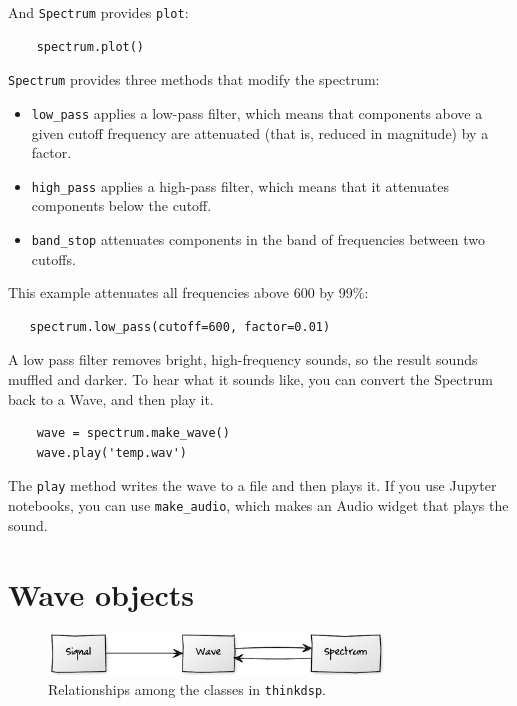 \documentclass[12pt]{book}
\begin{document}
And {\tt Spectrum} provides {\tt plot}:

\begin{verbatim}
    spectrum.plot()
\end{verbatim}


{\tt Spectrum} provides three methods that modify the spectrum:

\begin{itemize}

\item \verb"low_pass" applies a low-pass filter, which means that
  components above a given cutoff frequency are attenuated (that is,
  reduced in magnitude) by a factor.

\item \verb"high_pass" applies a high-pass filter, which means that
  it attenuates components below the cutoff.

\item \verb"band_stop" attenuates components in the band of
frequencies between two cutoffs.

\end{itemize}

This example attenuates all frequencies above 600 by 99\%:

\begin{verbatim}
   spectrum.low_pass(cutoff=600, factor=0.01)
\end{verbatim}

A low pass filter removes bright, high-frequency sounds, so
the result sounds muffled and darker.  To hear what it sounds
like, you can convert the Spectrum back to a Wave, and then play it.

\begin{verbatim}
    wave = spectrum.make_wave()
    wave.play('temp.wav')
\end{verbatim}

The {\tt play} method writes the wave to a file and then plays it.
If you use Jupyter notebooks, you can use \verb"make_audio", which
makes an Audio widget that plays the sound.


\section{Wave objects}

\begin{figure}
\centerline{\includegraphics[width=3.5in]{figs/uml_diagram1.pdf}}
\caption{Relationships among the classes in {\tt thinkdsp}.}
\label{fig.diagram1}
\end{figure}
\end{document}
